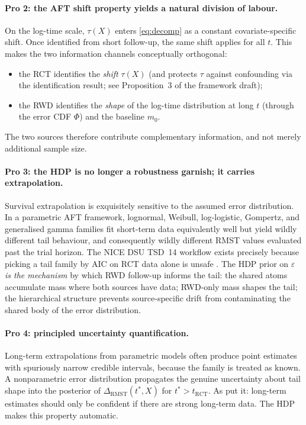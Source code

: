 \documentclass[11pt]{article}
\newcommand{\X}{X}
\newcommand{\tauf}{\tau}
\newcommand{\mzero}{m_{0}}
\newcommand{\RCT}{\mathrm{RCT}}
\newcommand{\RMST}{\mathrm{RMST}}
\begin{document}
\paragraph{Pro 2: the AFT shift property yields a natural division of labour.}
On the log-time scale, $\tauf(\X)$ enters \eqref{eq:decomp} as a constant
covariate-specific shift. Once identified from short follow-up, the same
shift applies for all $t$. This makes the two information channels conceptually
orthogonal:
\begin{itemize}[leftmargin=*]
  \item the RCT identifies the \emph{shift} $\tauf(\X)$ (and protects
        $\tauf$ against confounding via the identification result;
        see Proposition~3 of the framework draft);
  \item the RWD identifies the \emph{shape} of the log-time distribution at
        long $t$ (through the error CDF $\Phi$) and the baseline $\mzero$.
\end{itemize}
The two sources therefore contribute complementary information, and not
merely additional sample size.

\paragraph{Pro 3: the HDP is no longer a robustness garnish; it carries
extrapolation.} Survival extrapolation is exquisitely sensitive to the
assumed error distribution. In a parametric AFT framework, lognormal,
Weibull, log-logistic, Gompertz, and generalised gamma families fit
short-term data equivalently well but yield wildly different tail behaviour,
and consequently wildly different RMST values evaluated past the trial
horizon. The NICE DSU TSD~14 workflow exists precisely because picking a tail
family by AIC on RCT data alone is unsafe \citep{Latimer2013, BellGorrod2019}.
The HDP prior on $\varepsilon$ \emph{is the mechanism} by which RWD follow-up
informs the tail: the shared atoms accumulate mass where both sources have
data; RWD-only mass shapes the tail; the hierarchical structure prevents
source-specific drift from contaminating the shared body of the error
distribution.

\paragraph{Pro 4: principled uncertainty quantification.} Long-term
extrapolations from parametric models often produce point estimates with
spuriously narrow credible intervals, because the family is treated as known.
A nonparametric error distribution propagates the genuine uncertainty about
tail shape into the posterior of $\Delta_{\RMST}(t^{*},\X)$ for
$t^{*} > t_{\RCT}$. As \citet{Jackson2023} put it: long-term estimates should
only be confident if there are strong long-term data. The HDP makes this
property automatic.
\end{document}
